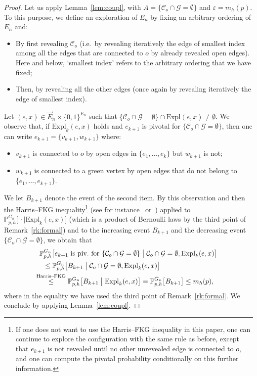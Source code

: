 \documentclass[10pt]{amsart}
\theoremstyle{definition}\newtheorem{defi}[theo]{Definition}\newtheorem{rema}[theo]{Remark}\newtheorem{exam}[theo]{Example}\newtheorem{exem}[theo]{Example}\newtheorem{nota}[theo]{Notation}
\newcommand{\Pro}{\mathbb{P}}
\newcommand{\calC}{\mathcal{C}}
\newcommand{\calG}{\mathcal{G}}
\newcommand{\Expl}{\mathrm{Expl}}
\begin{document}
\begin{proof}
Let us apply Lemma~\ref{lem:coupl}, with $A=\{\calC_o\cap\calG=\emptyset\}$ and $\varepsilon=m_h(p)$. To this purpose, we define an exploration of $E_n$ by fixing an arbitrary ordering of $E_n$ and:
\begin{itemize}
\item By first revealing $\calC_o$ (i.e.\ by revealing iteratively the edge of smallest index among all the edges that are connected to $o$ by already revealed open edges). Here and below, `smallest index' refers to the arbitrary ordering that we have fixed;
\item Then, by revealing all the other edges (once again by revealing iteratively the edge of smallest index).
\end{itemize}
Let $(e,x) \in \vec{E}_n\times\{0,1\}^{E_n}$ such that $\{\calC_o\cap\calG=\emptyset\}\cap\Expl(e,x)\neq\emptyset$. We observe that, if $\Expl_k(e,x)$ holds and $e_{k+1}$ is pivotal for $\{\calC_o \cap \calG = \emptyset\}$, then one can write $e_{k+1}=\{v_{k+1},w_{k+1}\}$ where:
\begin{itemize}
\item $v_{k+1}$ is connected to $o$ by open edges in $\{e_1,\dots,e_k\}$ but $w_{k+1}$ is not;
\item $w_{k+1}$ is connected to a green vertex by open edges that do not belong to $\{e_1,\dots,e_{k+1}\}$.
\end{itemize}
We let $B_{k+1}$ denote the event of the second item. By this observation and then the Harris--FKG inequality\footnote{If one does not want to use the Harris--FKG inequality in this paper, one can continue to explore the configuration with the same rule as before, except that $e_{k+1}$ is not revealed until no other unrevealed edge is connected to $o$, and one can compute the pivotal probability conditionally on this further information.} (see for instance~\cite[Theorem~2.4]{Gri99} or~\cite[Lemma~3]{BR06}) applied to $\Pro_{p,h}^{G_n} \big[\, \cdot \mid \Expl_k(e,x)\big]$ (which is a product of Bernoulli laws by the third point of Remark~\ref{rk:formal}) and to the increasing event $B_{k+1}$ and the decreasing event $\{\calC_o\cap\calG=\emptyset\}$, we obtain that
\pagebreak
\begin{multline*}
\Pro_{p,h}^{G_n} \big[e_{k+1}\text{ is piv.\ for } \{\calC_o \cap \calG = \emptyset\} \; \big| \; \calC_o \cap \calG = \emptyset, \Expl_k(e,x) \big]\\
\begin{aligned}
&\le \Pro_{p,h}^{G_n} \big[B_{k+1} \; \big| \; \calC_o \cap \calG = \emptyset, \Expl_k(e,x) \big]\\
&\mkern-23mu\overset{\text{Harris--FKG}}{\le} \Pro_{p,h}^{G_n} \big[B_{k+1} \; \big| \; \Expl_k(e,x) \big]= \Pro_{p,h}^{G_n} \big[B_{k+1} \big] \le m_h(p),
\end{aligned}
\end{multline*}
where in the equality we have used the third point of Remark~\ref{rk:formal}. We conclude by applying Lemma~\ref{lem:coupl}.
\end{proof}
\end{document}
